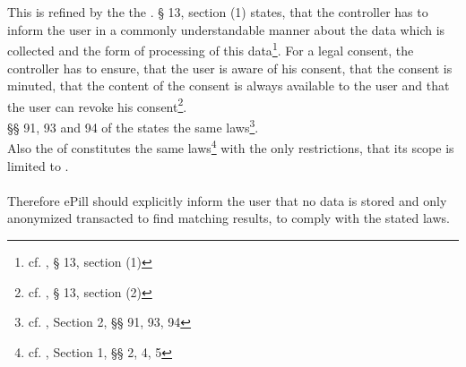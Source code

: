 \\
\\
This is refined by the the \TMGns. § 13, section (1) states, that the controller has to inform the user in a commonly understandable manner about the data which is collected and the form of processing of this data\footnote{cf. \cite{BundesregierungderBundesrepublikDeutschland.01.03.2007}, § 13, section (1)}. For a legal consent, the controller has to ensure, that the user is aware of his consent, that the consent is minuted, that the content of the consent is always available to the user and that the user can revoke his consent\footnote{cf. \cite{BundesregierungderBundesrepublikDeutschland.01.03.2007}, § 13, section (2)}.
\\
§§ 91, 93 and 94 of the \TKG states the same laws\footnote{cf. \cite{BundesregierungderBundesrepublikDeutschland.01.08.1996}, Section 2, §§ 91, 93, 94}.
\\
Also the \DPA of \NRW constitutes the same laws\footnote{cf. \cite{DerInnenministerdesLandesNordrheinWestfalen.09.06.2000}, Section 1, §§ 2, 4, 5} with the only restrictions, that its scope is limited to \NRWns.
\\
\\
Therefore ePill should explicitly inform the user that no data is stored and only anonymized transacted to find matching results, to comply with the stated laws.


